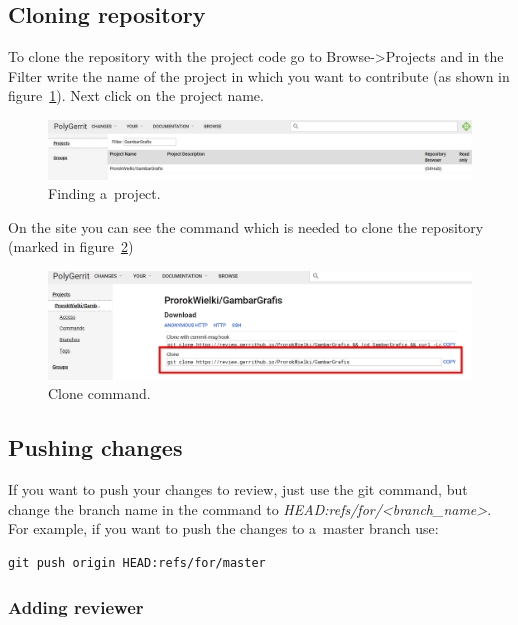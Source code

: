 \documentclass{article}
\begin{document}
\subsection{Cloning repository}

To clone the repository with the project code go to Browse->Projects and in the Filter write the name of the project in which you want to contribute (as shown in figure~\ref{fig:FindProject}). Next click on the project name.

\begin{figure}[!ht]
  \centering
  \includegraphics[width=.75\textwidth]{img/FindProject}
  \caption{Finding a~project.}
  \label{fig:FindProject}
\end{figure}

On the site you can see the command which is needed to clone the repository (marked in figure~\ref{fig:Clone})

\begin{figure}[!ht]
  \centering
  \includegraphics[width=.75\textwidth]{img/Clone}
  \caption{Clone command.}
  \label{fig:Clone}
\end{figure}

\subsection{Pushing changes}

If you want to push your changes to review, just use the git command, but change the branch name in the command to \textit{HEAD:refs/for/<branch\_name>}. For example, if you want to push the changes to a~master branch use: 

\begin{lstlisting}
git push origin HEAD:refs/for/master
\end{lstlisting}

\subsubsection{Adding reviewer}
\end{document}
